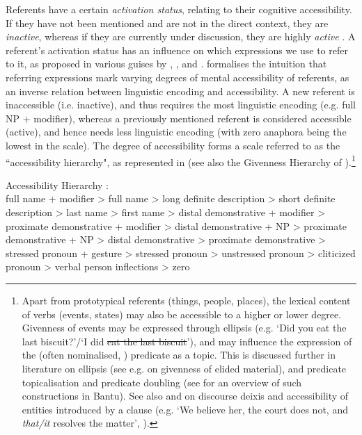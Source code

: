 \documentclass[output=paper]{langscibook}
\begin{document}
Referents have a certain \textit{activation status}, relating to their cognitive accessibility. If they have not been mentioned and are not in the direct context, they are \textit{inactive}, whereas if they are currently under discussion, they are highly \textit{active} \citep[see e.g.][]{Chafe1987}. A referent’s activation status has an influence on which expressions we use to refer to it, as proposed in various guises by \citet{Givón1976,Givón1983}, \citet{Chafe1976,Chafe1987}, \citet{Ariel1990,Ariel2001} and \citet{GundelEtAl1993}. \citeauthor{Ariel1990} formalises the intuition that referring expressions mark varying degrees of mental accessibility of referents, as an inverse relation between linguistic encoding and accessibility. A new referent is inaccessible (i.e. inactive), and thus requires the most linguistic encoding (e.g. full NP + modifier), whereas a previously mentioned referent is considered accessible (active), and hence needs less linguistic encoding (with zero anaphora being the lowest in the scale). The degree of accessibility forms a scale referred to as the ``accessibility hierarchy", as represented in  (see also the Givenness Hierarchy of \citealt{GundelEtAl1993}).\footnote{Apart from prototypical referents (things, people, places), the lexical content of verbs (events, states) may also be accessible to a higher or lower degree. Givenness of events may be expressed through ellipsis (e.g. ‘Did you eat the last biscuit?’\slash ‘I did \sout{eat the last biscuit}’), and may influence the expression of the (often nominalised, \citealt{Givón2001}) predicate as a topic. This is discussed further in literature on ellipsis (see e.g. \citealt{Merchant2001} on givenness of elided material), and predicate topicalisation and predicate doubling (see \citealt{GüldemannFiedler2022} for an overview of such constructions in Bantu). See also \citet{HegartyEtAl2001} and \citet{GundelEtAl2003} on discourse deixis and accessibility of entities introduced by a clause (e.g. ‘We believe her, the court does not, and \textit{that/it} resolves the matter’, \citealt[282]{GundelEtAl2003}).}

\ea
\label{bkm:Ref122686119}
Accessibility Hierarchy \citep[31]{Ariel2001}:\\
full name + modifier > full name > long definite description > short definite description > last name > first name > distal demonstrative + modifier > proximate demonstrative + modifier > distal demonstrative + NP > proximate demonstrative + NP
> distal demonstrative > proximate demonstrative > stressed pronoun + gesture > stressed pronoun > unstressed pronoun > cliticized pronoun > verbal person inflections > zero 
\z
\end{document}
